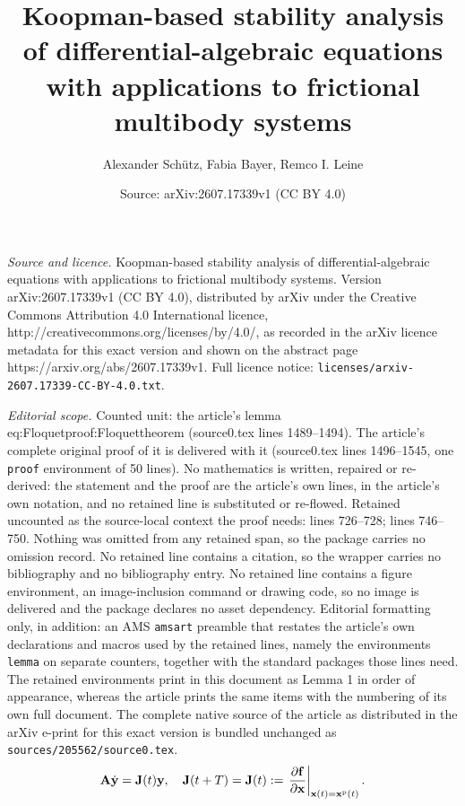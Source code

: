 \documentclass[10pt,a4paper]{amsart}
\title{Koopman-based stability analysis of differential-algebraic equations with applications to frictional multibody systems}
\author{Alexander Sch\"utz, Fabia Bayer, Remco I. Leine}
\date{Source: arXiv:2607.17339v1 (CC BY 4.0)}
\newcommand{\dy}{\dot{\vy}}
\newcommand{\pd}[2]{\frac{\partial #1}{\partial #2}}
\newcommand{\rp}{\mathrm p}
\newcommand{\vA}{\mathbf A}
\newcommand{\vJ}{\mathbf J}
\newcommand{\vf}{\mathbf f}
\newcommand{\vx}{\mathbf x}
\newcommand{\vy}{\mathbf y}
\begin{document}
\maketitle

\noindent\emph{Source and licence.} Koopman-based stability analysis of differential-algebraic equations with applications to frictional multibody systems. Version arXiv:2607.17339v1 (CC BY 4.0), distributed by arXiv under the Creative Commons Attribution 4.0 International licence, http://creativecommons.org/licenses/by/4.0/, as recorded in the arXiv licence metadata for this exact version and shown on the abstract page https://arxiv.org/abs/2607.17339v1. Full licence notice: \texttt{licenses/arxiv-2607.17339-CC-BY-4.0.txt}.\par\smallskip

\noindent\textit{Editorial scope.} Counted unit: the article's lemma eq:Floquetproof:Floquettheorem (source0.tex lines 1489--1494). The article's complete original proof of it is delivered with it (source0.tex lines 1496--1545, one \texttt{proof} environment of 50 lines). No mathematics is written, repaired or re-derived: the statement and the proof are the article's own lines, in the article's own notation, and no retained line is substituted or re-flowed.  Retained uncounted as the source-local context the proof needs: lines 726--728; lines 746--750.  Nothing was omitted from any retained span, so the package carries no omission record.  No retained line contains a citation, so the wrapper carries no bibliography and no bibliography entry.  No retained line contains a figure environment, an image-inclusion command or drawing code, so no image is delivered and the package declares no asset dependency.  Editorial formatting only, in addition: an AMS \texttt{amsart} preamble that restates the article's own declarations and macros used by the retained lines, namely the environments \texttt{lemma} on separate counters, together with the standard packages those lines need.  The retained environments print in this document as Lemma 1 in order of appearance, whereas the article prints the same items with the numbering of its own full document.  The complete native source of the article as distributed in the arXiv e-print for this exact version is bundled unchanged as \texttt{sources/205562/source0.tex}.
\begin{equation}\label{eq:KHDAE:LTPDAE}
    \vA\dy = \vJ(t)\vy\textnormal{,}\quad \vJ(t+T) = \vJ(t):= \left.\pd{\vf}{\vx}\right|_{\vx(t)=\vx^\rp(t)}\textnormal{.}
\end{equation}
\end{document}
